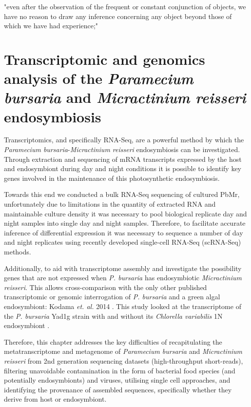 \graphicspath{{chapters/4.Chapter_2/figures}}

\begin{savequote}[75mm]
"even after the observation of the frequent or constant conjunction of objects, we have no reason to draw any inference concerning any object beyond those of which we have had experience;"
\end{savequote}


\chapter{Transcriptomic and genomics analysis of the \textit{Paramecium bursaria} and \textit{Micractinium reisseri} endosymbiosis}

Transcriptomics, and specifically RNA-Seq, are a powerful method by which the \textit{Paramecium bursaria}-\textit{Micractinium reisseri}
endosymbiosis can be investigated. Through extraction and sequencing of mRNA transcripts expressed by the host and endosymbiont
during day and night conditions it is possible to identify key genes involved in the maintenance of this photosynthetic endosymbiosis.

Towards this end we conducted a bulk RNA-Seq sequencing of cultured PbMr, unfortunately due to limitations in the quantity of
extracted RNA and maintainable culture density it was necessary to pool biological replicate day and night samples into single
day and night samples.  Therefore, to facilitate accurate inference of differential expression it was necessary
to sequence a number of day and night replicates using recently developed single-cell RNA-Seq (scRNA-Seq) methods.

Additionally, to aid with transcriptome assembly and investigate the possibility genes that are not expressed
when \textit{P. bursaria} has endosymbiotic \textit{Micractinium reisseri}.  This allows cross-comparison with
the only other published transcriptomic or genomic interrogation of \textit{P. bursaria} and a green algal endosymbiont: Kodama \textit{et. al.} 2014 \citep{Kodama2014}.
This study looked at the transcriptome of the \textit{P. bursaria} Yad1g strain with and without its \textit{Chlorella variabilis} 1N endosymbiont \citep{Kodama2014}.

Therefore, this chapter addresses the key difficulties of recapitulating the metatranscriptome and metagenome of \textit{Paramecium bursaria}
and \textit{Micractinium reisseri} from 2nd generation sequencing datasets (high-throughput short-reads), filtering unavoidable contamination
in the form of bacterial food species (and potentially endosymbionts) and viruses, utilising single cell approaches,
and identifying the provenance of assembled sequences, specifically whether they derive from host or endosymbiont.



